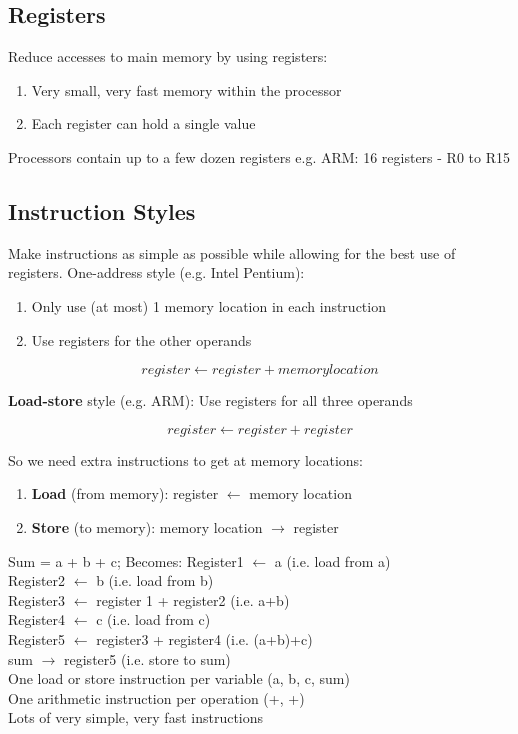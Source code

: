 \documentclass{article}
\begin{document}
\subsection{Registers}
Reduce accesses to main memory by using registers:
\begin{enumerate}
\item Very small, very fast memory within the processor
\item Each register can hold a single value
\end{enumerate}
Processors contain up to a few dozen registers e.g. ARM: 16 registers - R0 to R15

\subsection{Instruction Styles}
Make instructions as simple as possible while allowing for the best use of registers. One-address style (e.g. Intel Pentium):
\begin{enumerate}
	\item Only use (at most) 1 memory location in each instruction
	\item Use registers for the other operands
\end{enumerate}

\[
	register \leftarrow register + memory location
\]

\textbf{Load-store} style (e.g. ARM): Use registers for all three operands

\[
	register \leftarrow register + register
\]

So we need extra instructions to get at memory locations:
\begin{enumerate}
	\item \textbf{Load} (from memory): register \(\leftarrow\) memory location
	\item \textbf{Store} (to memory): memory location \(\rightarrow\) register
\end{enumerate}

Sum = a + b + c;
Becomes:
Register1 \(\leftarrow\) a                      (i.e. load from a)\\
Register2 \(\leftarrow\) b                      (i.e. load from b)\\
Register3 \(\leftarrow\) register 1 + register2 (i.e. a+b)\\
Register4 \(\leftarrow\) c                      (i.e. load from c)\\
Register5 \(\leftarrow\) register3 + register4  (i.e. (a+b)+c)\\
sum \(\rightarrow\) register5                   (i.e. store to sum)\\
One load or store instruction per variable (a, b, c, sum)\\
One arithmetic instruction per operation (+, +)\\
Lots of very simple, very fast instructions
\end{document}
